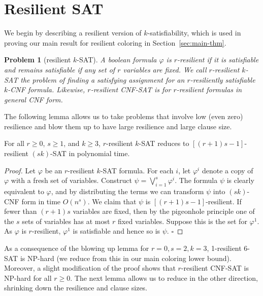 \documentclass{llncs}
\newtheorem{prob}{Problem}
\begin{document}
\section{Resilient SAT}\label{sec:resilient-sat}

We begin by describing a resilient version of $k$-satisfiability, which is used
in proving our main result for resilient coloring in
Section~\ref{sec:main-thm}. 

\begin{prob}[resilient $k$-SAT]
A boolean formula $\varphi$ is \emph{$r$-resilient} if it is satisfiable
and remains satisfiable if any set of $r$ variables are fixed. We call
\emph{$r$-resilient $k$-SAT} the problem of finding a satisfying assignment for
an $r$-resiliently satisfiable $k$-CNF formula. Likewise, $r$-resilient CNF-SAT
is for $r$-resilient formulas in general CNF form.  
\end{prob}

The following lemma allows us to take problems that involve low (even zero)
resilience and blow them up to have large resilience and large clause size.

\begin{lemma}[blowing up]
\label{lemma:up}For all $r \geq 0$, $s \geq 1$, and $k \geq 3$, $r$-resilient
$k$-SAT reduces to $[(r+1)s-1]$-resilient $(sk)$-SAT in polynomial time.

\end{lemma}
\begin{proof}

Let $\varphi$ be an $r$-resilient $k$-SAT formula. For each $i$, let
$\varphi^i$ denote a copy of $\varphi$ with a fresh set of variables. Construct
$\psi = \bigvee_{i = 1}^s \varphi^i$. The formula $\psi$ is clearly equivalent
to $\varphi$, and by distributing the terms we can transform $\psi$ into
$(sk)$-CNF form in time $O(n^s)$. We claim that $\psi$ is $[(r+1)s -
1]$-resilient. If fewer than $(r+1)s$ variables are fixed, then by the
pigeonhole principle one of the $s$ sets of variables has at most $r$ fixed
variables. Suppose this is the set for $\varphi^1$. As $\varphi$ is
$r$-resilient, $\varphi^1$ is satisfiable and hence so is $\psi$. \hfill
$\square$ 

\end{proof}

As a consequence of the blowing up lemma for $r=0, s=2, k=3$, 1-resilient 6-SAT
is NP-hard (we reduce from this in our main coloring lower bound). Moreover, a
slight modification of the proof shows that $r$-resilient CNF-SAT is NP-hard
for all $r \geq 0$. The next lemma allows us to reduce in the other direction,
shrinking down the resilience and clause sizes.
\end{document}
